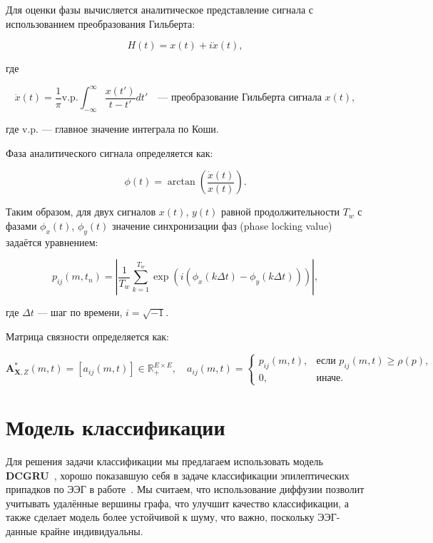 \documentclass[12pt, twoside]{article}
\begin{document}
Для оценки фазы вычисляется аналитическое представление сигнала с использованием преобразования Гильберта:

\begin{equation}
H(t) = x(t) + i\dot{x}(t),
\end{equation}

где

\begin{equation}
\dot{x}(t) = \frac{1}{\pi} \text{v.p.} \int_{-\infty}^{\infty} \frac{x(t')}{t - t'} dt' \quad \text{— преобразование Гильберта сигнала } x(t),
\end{equation}

\noindent где v.p. — главное значение интеграла по Коши.

Фаза аналитического сигнала определяется как:

\begin{equation}
\phi(t) = \arctan \left( \frac{\dot{x}(t)}{x(t)} \right).
\end{equation}

Таким образом, для двух сигналов $x(t)$, $y(t)$ равной продолжительности $T_w$ с фазами $\phi_x(t)$, $\phi_y(t)$ значение синхронизации фаз (phase locking value) \cite{9} задаётся уравнением:

\begin{equation}
p_{ij}(m, t_n) = \left| \frac{1}{T_w} \sum_{k=1}^{T_w} \exp \left( i(\phi_x(k \Delta t) - \phi_y(k \Delta t)) \right) \right|,
\end{equation}

где $\Delta t$ — шаг по времени, $i = \sqrt{-1}$.

Матрица связности определяется как:

\begin{equation}
\mathbf{A}_{\mathbf{X}, Z}^*(m, t) = [a_{ij}(m, t)] \in \mathbb{R}_+^{E \times E}, \quad a_{ij}(m, t) = 
\begin{cases} 
p_{ij}(m, t), & \text{если } p_{ij}(m, t) \geq \rho(p), \\
0, & \text{иначе}.
\end{cases}
\end{equation}



\section{Модель классификации}

Для решения задачи классификации мы предлагаем использовать модель \textbf{DCGRU}~\cite{DCRNN}, хорошо показавшую себя в задаче классификации эпилептических припадков по ЭЭГ в работе~\cite{DCGRU}. Мы считаем, что использование диффузии позволит учитывать удалённые вершины графа, что улучшит качество классификации, а также сделает модель более устойчивой к шуму, что важно, поскольку ЭЭГ-данные крайне индивидуальны.
\end{document}
